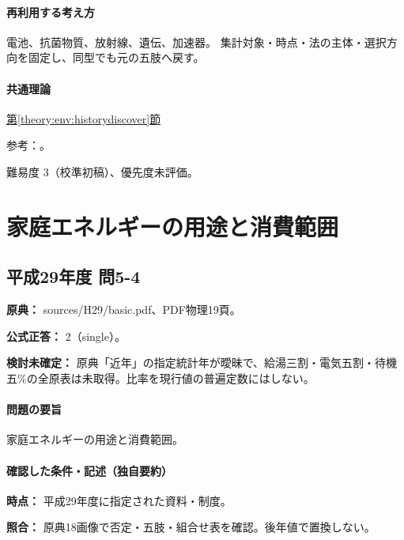 \paragraph{再利用する考え方} 電池、抗菌物質、放射線、遺伝、加速器。 集計対象・時点・法の主体・選択方向を固定し、同型でも元の五肢へ戻す。

\paragraph{共通理論} \hyperref[theory:env:historydiscover]{第\ref*{theory:env:historydiscover}節}

\par 参考：\cite{env59_lawrence}。

\par 難易度 3（校準初稿）、優先度未評価。

\section{家庭エネルギーの用途と消費範囲}

\subsection{平成29年度 問5-4}
\label{q:h29-reg-basic-5-4}

\noindent\textbf{原典：} sources/H29/basic.pdf、PDF物理19頁。

\textbf{公式正答：} 2（single）。

\par\textbf{検討未確定：} 原典「近年」の指定統計年が曖昧で、給湯三割・電気五割・待機五\%の全原表は未取得。比率を現行値の普遍定数にはしない。

\paragraph{問題の要旨} 家庭エネルギーの用途と消費範囲。

\paragraph{確認した条件・記述（独自要約）}\mbox{}\par

\noindent\textbf{時点：} 平成29年度に指定された資料・制度。\par

\noindent\textbf{照合：} 原典18画像で否定・五肢・組合せ表を確認。後年値で置換しない。\par

